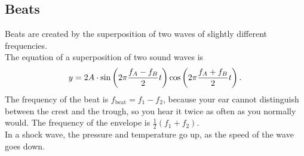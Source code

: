\documentclass[class=article, crop=false]{standalone}
\begin{document}
  \subsection{Beats}
  Beats are created by the superposition of two waves of slightly different frequencies.\\[10pt]
  The equation of a superposition of two sound waves is 
  \[
    y = 2A \cdot \sin \left( 2\pi \frac{f_A - f_B}{2}t \right)\cos \left( 2\pi \frac{f_A + f_B}{2}t \right).
  \]
  The frequency of the beat is $f_{\text{beat}} = f_1 - f_2$, because your ear cannot distinguish between the crest and the trough, so you hear it twice as often as you normally would. The frequency of the envelope is $\frac{1}{2}(f_1+f_2)$. \\[10pt]
  In a shock wave, the pressure and temperature go up, as the speed of the wave goes down.
\end{document}

